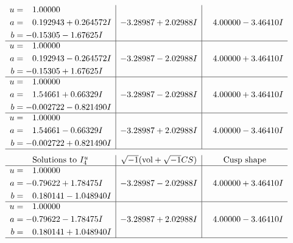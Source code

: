 \documentclass[1p]{elsarticle_modified}
\theoremstyle{definition}
\newcommand{\I}{\sqrt{-1}}
\begin{document}
$$\begin{array}{c|c|c}
\begin{aligned}
u &= \phantom{-}1.00000\phantom{ +0.000000I} \\
a &= \phantom{-}0.192943 + 0.264572 I \\
b &= -0.15305 - 1.67625 I\end{aligned}
 & -3.28987 + 2.02988 I & \phantom{-}4.00000 - 3.46410 I \\ \hline\begin{aligned}
u &= \phantom{-}1.00000\phantom{ +0.000000I} \\
a &= \phantom{-}0.192943 - 0.264572 I \\
b &= -0.15305 + 1.67625 I\end{aligned}
 & -3.28987 - 2.02988 I & \phantom{-}4.00000 + 3.46410 I \\ \hline\begin{aligned}
u &= \phantom{-}1.00000\phantom{ +0.000000I} \\
a &= \phantom{-}1.54661 + 0.66329 I \\
b &= -0.002722 - 0.821490 I\end{aligned}
 & -3.28987 - 2.02988 I & \phantom{-}4.00000 + 3.46410 I \\ \hline\begin{aligned}
u &= \phantom{-}1.00000\phantom{ +0.000000I} \\
a &= \phantom{-}1.54661 - 0.66329 I \\
b &= -0.002722 + 0.821490 I\end{aligned}
 & -3.28987 + 2.02988 I & \phantom{-}4.00000 - 3.46410 I\\
 \hline 
 \end{array}$$\newpage$$\begin{array}{c|c|c}  
\text{Solutions to }I^u_{4}& \I (\text{vol} + \sqrt{-1}CS) & \text{Cusp shape}\\
 \hline 
\begin{aligned}
u &= \phantom{-}1.00000\phantom{ +0.000000I} \\
a &= -0.79622 + 1.78475 I \\
b &= \phantom{-}0.180141 - 1.048940 I\end{aligned}
 & -3.28987 - 2.02988 I & \phantom{-}4.00000 + 3.46410 I \\ \hline\begin{aligned}
u &= \phantom{-}1.00000\phantom{ +0.000000I} \\
a &= -0.79622 - 1.78475 I \\
b &= \phantom{-}0.180141 + 1.048940 I\end{aligned}
 & -3.28987 + 2.02988 I & \phantom{-}4.00000 - 3.46410 I\\
 \hline 
 \end{array}$$\newpage\newpage\renewcommand{\arraystretch}{1}
\end{document}
